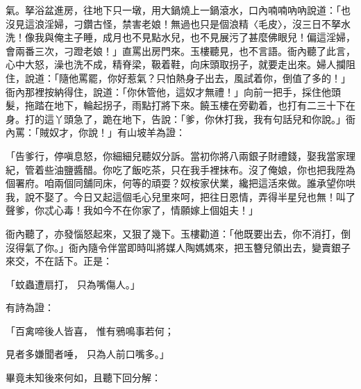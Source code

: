 \begin{showcontents}{}
氣。拏浴盆進房，往地下只一墩，用大鍋燒上一鍋滾水，口內喃喃吶吶說道：「也沒見這浪淫婦，刁鑽古怪，禁害老娘！無過也只是個浪精〈毛皮〉，沒三日不拏水洗！像我與俺主子睡，成月也不見點水兒，也不見展污了甚麼佛眼兒！偏這淫婦，會兩番三次，刁蹬老娘！」直罵出房門來。玉樓聽見，也不言語。衙內聽了此言，心中大怒，澡也洗不成，精脊梁，靸着鞋，向床頭取拐子，就要走出來。婦人攔阻住，說道：「隨他罵罷，你好惹氣？只怕熱身子出去，風試着你，倒值了多的！」衙內那裡按納得住，說道：「你休管他，這奴才無禮！」向前一把手，採住他頭髮，拖踏在地下，輪起拐子，雨點打將下來。饒玉樓在旁勸着，也打有二三十下在身。打的這丫頭急了，跪在地下，告說：「爹，你休打我，我有句話兒和你說。」衙內罵：「賊奴才，你說！」有山坡羊為證：

「告爹行，停嗔息怒，你細細兒聽奴分訴。當初你將八兩銀子財禮錢，娶我當家理紀，管着些油鹽醬醋。你吃了飯吃茶，只在我手裡抹布。沒了俺娘，你也把我陞為個署府。咱兩個同舖同床，何等的頑耍？奴桉家伏業，纔把這活來做。誰承望你哄我，說不娶了。今日又起這個毛心兒里來呵，把往日恩情，弄得半星兒也無！叫了聲爹，你忒心毒！我如今不在你家了，情願嫁上個姐夫！」

衙內聽了，亦發惱怒起來，又狠了幾下。玉樓勸道：「他既要出去，你不消打，倒沒得氣了你。」衙內隨令伴當即時叫將媒人陶媽媽來，把玉簪兒領出去，變賣銀子來交，不在話下。正是：

「蚊蟲遭扇打，  只為嘴傷人。」

有詩為證：

「百禽啼後人皆喜，  惟有鴉鳴事若何；

見者多嫌聞者唾，  只為人前口嘴多。」

畢竟未知後來何如，且聽下回分解：





\end{showcontents}


